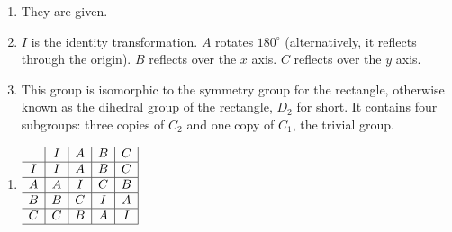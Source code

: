 \documentclass[../gatm.tex]{subfiles}
\begin{document}

\begin{minipage}{0.6\textwidth}
\begin{enumerate}[label=(\alph*)]
\item They are given.
\item $I$ is the identity transformation. $A$ rotates $180^\circ$ (alternatively, it reflects through the origin). $B$ reflects over the $x$ axis. $C$ reflects over the $y$ axis.
\setcounter{mg_enumi}{\value{enumi}}
\setcounter{enumi}{4}
\item This group is isomorphic to the symmetry group for the rectangle, otherwise known as the dihedral group of the rectangle, $D_2$ for short. It contains four subgroups: three copies of $C_2$ and one copy of $C_1$, the trivial group.
\end{enumerate}
\end{minipage}\hfill
\begin{minipage}{0.25\textwidth}
\begin{enumerate}[label=(\alph*)]
\setcounter{enumi}{\value{mg_enumi}}
\item $\begin{array}{c|c|c|c|c|}
& I & A & B & C \\ \hline
I & I & A & B & C \\ \hline
A & A & I & C & B \\ \hline
B & B & C & I & A \\ \hline
C & C & B & A & I \\ \hline
\end{array}$
\end{enumerate}
\end{minipage}
\vspace{2cm}

\end{document}
